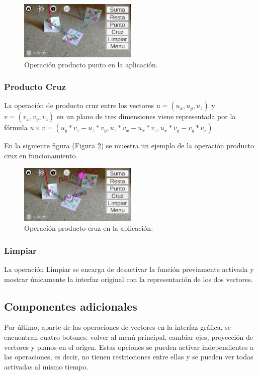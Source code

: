 \begin{figure}[hbt!]
\centering
\includegraphics[width=0.5\textwidth]{figuras/vectores/ProductoPunto.png}
\caption{\label{fig:vec_punto}Operación producto punto en la aplicación.}
\end{figure}
\FloatBarrier

\subsubsection{Producto Cruz}
La operación de producto cruz entre los vectores $u=(u_x,u_y,u_z)$ y $v=(v_x,v_y,v_z)$ en un plano de tres dimensiones viene representada por la fórmula $u \times v = (u_y*v_z - u_z*v_y, u_z*v_x - u_x*v_z, u_x*v_y - v_y*v_x)$.

En la siguiente figura (Figura \ref{fig:vec_cruz}) se muestra un ejemplo de la operación producto cruz en funcionamiento.

\begin{figure}[hbt!]
\centering
\includegraphics[width=0.5\textwidth]{figuras/vectores/ProductoCruz.png}
\caption{\label{fig:vec_cruz}Operación producto cruz en la aplicación.}
\end{figure}
\FloatBarrier

\subsubsection{Limpiar}

La operación Limpiar se encarga de desactivar la función previamente activada y mostrar únicamente la interfaz original con la representación de los dos vectores.

\subsection{Componentes adicionales}
Por último, aparte de las operaciones de vectores en la interfaz gráfica, se encuentran cuatro botones: volver al menú principal, cambiar ejes, proyección de vectores y planos en el origen. Estas opciones se pueden activar independientes a las operaciones, es decir, no tienen restricciones entre ellas y se pueden ver todas activadas al mismo tiempo.

